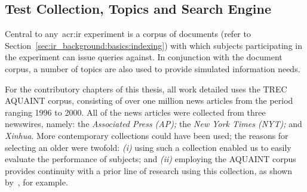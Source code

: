 %
%
%
%
%
%
%

\subsection{Test Collection, Topics and Search Engine}\label{sec:csm:methodology:collection}
Central to any~\gls{acr:ir} experiment is a corpus of documents (refer to Section~\ref{sec:ir_background:basics:indexing}) with which subjects participating in the experiment can issue queries against. In conjunction with the document corpus, a number of topics are also used to provide simulated information needs.

For the contributory chapters of this thesis, all work detailed uses the TREC AQUAINT corpus, consisting of over one million news articles from the period ranging 1996 to 2000. All of the news articles were collected from three newswires, namely: the \emph{Associated Press (AP);} the \emph{New York Times (NYT);} and \emph{Xinhua}. More contemporary collections could have been used; the reasons for selecting an older were twofold: \emph{(i)} using such a collection enabled us to easily evaluate the performance of subjects; and \emph{(ii)} employing the AQUAINT corpus provides continuity with a prior line of research using this collection, as shown by~\cite{azzopardi2013query_cost}, for example.

